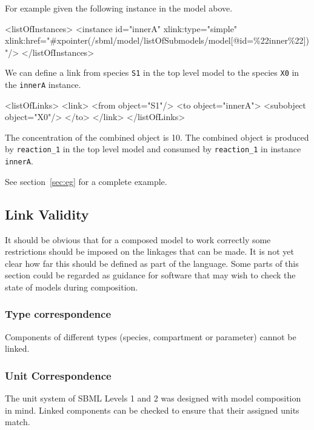 \documentclass{cekarticle}
\begin{document}
For example given the following instance in the model above.

\begin{example}
<listOfInstances>
    <instance
        id="innerA"
        xlink:type="simple"
        xlink:href="#xpointer(/sbml/model/listOfSubmodels/model[@id=\%22inner\%22])"/>
</listOfInstances>
\end{example}

We can define a link from species \texttt{S1} in the top level model to the species \texttt{X0} in the \texttt{innerA} instance.

\begin{example}
<listOfLinks>
    <link>
        <from object="S1"/>
        <to object="innerA">
            <subobject object="X0"/>
        </to>
    </link>
</listOfLinks>
\end{example}

The concentration of the combined object is 10.  The combined object is produced by \texttt{reaction\_1} in the top level model and
consumed by \texttt{reaction\_1} in instance \texttt{innerA}.

See section~\ref{sec:eg} for a complete example.

\subsection{Link Validity}
\label{sec:linkvalidity}

It should be obvious that for a composed model to work correctly some restrictions
should be imposed on the linkages that can be made.  It is not yet clear how far this
should be defined as part of the language.  Some parts of this section could be regarded
as guidance for software that may wish to check the state of models during composition.

\subsubsection{Type correspondence}
\label{sec:typecorrespondence}

Components of different types (species, compartment or parameter) cannot
be linked.

\subsubsection{Unit Correspondence}
\label{sec:unitcorrespondence}

The unit system of SBML Levels 1 and 2 was designed with model composition in mind.
Linked components can be checked to ensure that their assigned units match. 
\end{document}
